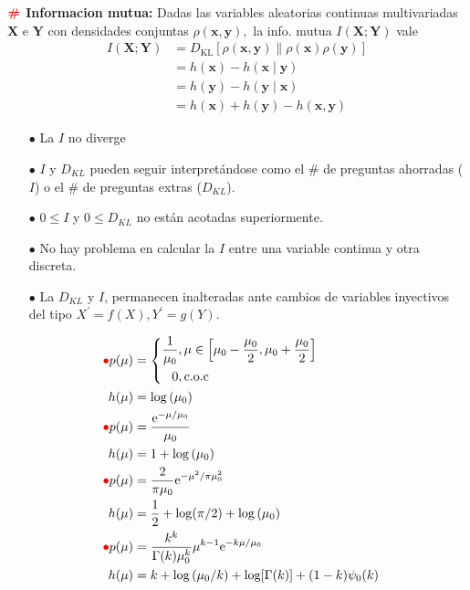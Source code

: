 \documentclass[%
 reprint,
 amsmath,amssymb,
 aps,
]{revtex4-1}
\begin{document}
\textbf{$\color{red}{\textbf{\#}}$ Informacion mutua:} 
Dadas las variables aleatorias continuas multivariadas $\boldsymbol{X}$ e $\boldsymbol{Y}$ con densidades conjuntas $\rho(\boldsymbol{x}, \boldsymbol{y}),$
la info. mutua $I(\boldsymbol{X} ; \boldsymbol{Y})$ vale
$$
\begin{aligned}
I(\boldsymbol{X} ; \boldsymbol{Y}) &=D_{\mathrm{KL}}[\rho(\boldsymbol{x}, \boldsymbol{y}) \| \rho(\boldsymbol{x}) \rho(\boldsymbol{y})] \\
&=h(\boldsymbol{x})-h(\boldsymbol{x} \mid \boldsymbol{y}) \\
&=h(\boldsymbol{y})-h(\boldsymbol{y} \mid \boldsymbol{x}) \\
&=h(\boldsymbol{x})+h(\boldsymbol{y})-h(\boldsymbol{x}, \boldsymbol{y})
\end{aligned}
$$
\begin{itemize}
  \item[$\bullet$] La $I$ no diverge
  \item[$\bullet$] $I$ y $D_{KL}$ pueden seguir interpretándose como el \# de preguntas ahorradas ($I$) o el \# de preguntas
  extras ($D_{KL}$).
  \item[$\bullet$] $0 \leq I$ y $0 \leq D_{KL}$ no están acotadas superiormente.
  \item[$\bullet$] No hay problema en calcular la $I$ entre una variable continua y otra discreta. 
  \item[$\bullet$] La $D_{KL}$ y $I$, permanecen inalteradas ante cambios de variables inyectivos del tipo $X^{\prime}=f(X), Y^{\prime}=g(Y).$
\end{itemize}
$$
\begin{aligned}
  {\color{red}{\bullet}} p(\mu)&=
  \left\{
    \begin{aligned}
      \frac{1}{\mu_{0}} & , \mu \in\left[\mu_{0}-\frac{\mu_0}{2}, \mu_{0}+\frac{\mu_0}{2}\right] \\
      0 & ,\text{c.o.c}
    \end{aligned}
  \right. \\
  h(\mu) &=\log \left(\mu_{0}\right)\\
  {\color{red}{\bullet}} p(\mu) &=\frac{\mathrm{e}^{-\mu / \mu_{0}}}{\mu_{0}} \\
  {\quad} h(\mu) &=1+\log \left(\mu_{0}\right)\\
  {\color{red}{\bullet}} p(\mu) &=\frac{2}{\pi \mu_{0}} \mathrm{e}^{-\mu^{2} / \pi \mu_{0}^{2}} \\
  {\quad} h(\mu) &=\frac{1}{2}+\log (\pi / 2)+\log \left(\mu_{0}\right) \\
  {\color{red}{\bullet}} p(\mu) &=\frac{k^{k}}{\Gamma(k) \mu_{0}^{k}} \mu^{k-1} \mathrm{e}^{-k \mu / \mu_{0}} \\ 
  h(\mu)&=k+\log \left(\mu_{0} / k\right)+\log [\Gamma(k)]+(1-k) \psi_{0}(k)
\end{aligned}
$$
\end{document}
